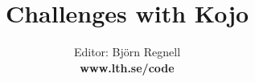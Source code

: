 \documentclass[12pt]{book}
\title{\fontsize{40}{40}\bf\sffamily\selectfont Challenges with Kojo} %
\author{Editor: Björn Regnell \\ \bf www.lth.se/code} %
\date{}
\begin{document}
\maketitle
\newpage
\thispagestyle{empty}


\newpage
\begin{multicols}{3}
\tableofcontents 
\mainmatter
\end{multicols}

\fontsize{16}{18}\selectfont\raggedright

\end{document}
